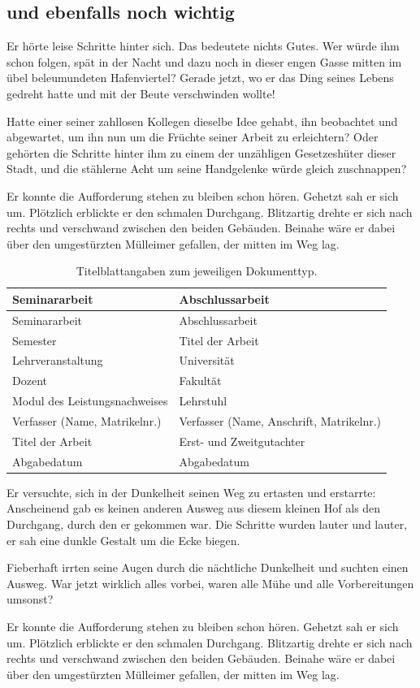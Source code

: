 \documentclass[12pt,ngerman,a4paper,DIV=9,headinclude=true,footinclude=false,titlepage=true,headsepline=true,toc=bibliography,toc=listof]{scrartcl}
\begin{document}
\subsection{und ebenfalls noch
wichtig}\label{und-ebenfalls-noch-wichtig}

Er hörte leise Schritte hinter sich. Das bedeutete nichts Gutes. Wer
würde ihm schon folgen, spät in der Nacht und dazu noch in dieser engen
Gasse mitten im übel beleumundeten Hafenviertel? Gerade jetzt, wo er das
Ding seines Lebens gedreht hatte und mit der Beute verschwinden wollte!

Hatte einer seiner zahllosen Kollegen dieselbe Idee gehabt, ihn
beobachtet und abgewartet, um ihn nun um die Früchte seiner Arbeit zu
erleichtern? Oder gehörten die Schritte hinter ihm zu einem der
unzähligen Gesetzeshüter dieser Stadt, und die stählerne Acht um seine
Handgelenke würde gleich zuschnappen?

Er konnte die Aufforderung stehen zu bleiben schon hören. Gehetzt sah er
sich um. Plötzlich erblickte er den schmalen Durchgang. Blitzartig
drehte er sich nach rechts und verschwand zwischen den beiden Gebäuden.
Beinahe wäre er dabei über den umgestürzten Mülleimer gefallen, der
mitten im Weg lag.

\begin{longtable}[c]{@{}ll@{}}
\caption{Titelblattangaben zum jeweiligen Dokumenttyp.}\tabularnewline
\toprule
Seminararbeit & Abschlussarbeit\tabularnewline
\midrule
\endfirsthead
\toprule
Seminararbeit & Abschlussarbeit\tabularnewline
\midrule
\endhead
Semester & Titel der Arbeit\tabularnewline
Lehrveranstaltung & Universität\tabularnewline
Dozent & Fakultät\tabularnewline
Modul des Leistungsnachweises & Lehrstuhl\tabularnewline
Verfasser (Name, Matrikelnr.) & Verfasser (Name, Anschrift,
Matrikelnr.)\tabularnewline
Titel der Arbeit & Erst- und Zweitgutachter\tabularnewline
Abgabedatum & Abgabedatum\tabularnewline
\bottomrule
\end{longtable}

Er versuchte, sich in der Dunkelheit seinen Weg zu ertasten und
erstarrte: Anscheinend gab es keinen anderen Ausweg aus diesem kleinen
Hof als den Durchgang, durch den er gekommen war. Die Schritte wurden
lauter und lauter, er sah eine dunkle Gestalt um die Ecke biegen.

Fieberhaft irrten seine Augen durch die nächtliche Dunkelheit und
suchten einen Ausweg. War jetzt wirklich alles vorbei, waren alle Mühe
und alle Vorbereitungen umsonst?

Er konnte die Aufforderung stehen zu bleiben schon hören. Gehetzt sah er
sich um. Plötzlich erblickte er den schmalen Durchgang. Blitzartig
drehte er sich nach rechts und verschwand zwischen den beiden Gebäuden.
Beinahe wäre er dabei über den umgestürzten Mülleimer gefallen, der
mitten im Weg lag.
\end{document}
